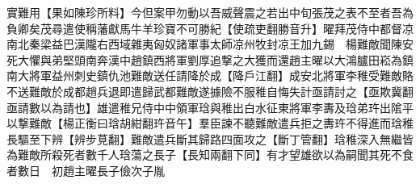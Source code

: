 實難用【果如陳珍所料】今但案甲勿動以吾威聲震之若出中旬張茂之表不至者吾為負卿矣茂尋遣使稱藩獻馬牛羊珍寶不可勝紀【使疏吏翻勝音升】曜拜茂侍中都督凉南北秦梁益巴漢隴右西域雜夷匈奴諸軍事太師凉州牧封凉王加九錫　楊難敵聞陳安死大懼與弟堅頭南奔漢中趙鎮西將軍劉厚追撃之大獲而還趙主曜以大鴻臚田崧為鎮南大將軍益州刺史鎮仇池難敵送任請降於成【降戶江翻】成安北將軍李稚受難敵賂不送難敵於成都趙兵退即遣歸武都難敵遂據險不服稚自悔失計亟請討之【亟欺冀翻亟請數以為請也】雄遣稚兄侍中中領軍琀與稚出白水征東將軍李夀及琀弟玝出隂平以撃難敵【楊正衡曰琀胡紺翻玝音午】羣臣諫不聽難敵遣兵拒之夀玝不得進而琀稚長驅至下辨【辨步莧翻】難敵遣兵斷其歸路四面攻之【斷丁管翻】琀稚深入無繼皆為難敵所殺死者數千人琀蕩之長子【長知兩翻下同】有才望雄欲以為嗣聞其死不食者數日　初趙主曜長子儉次子胤